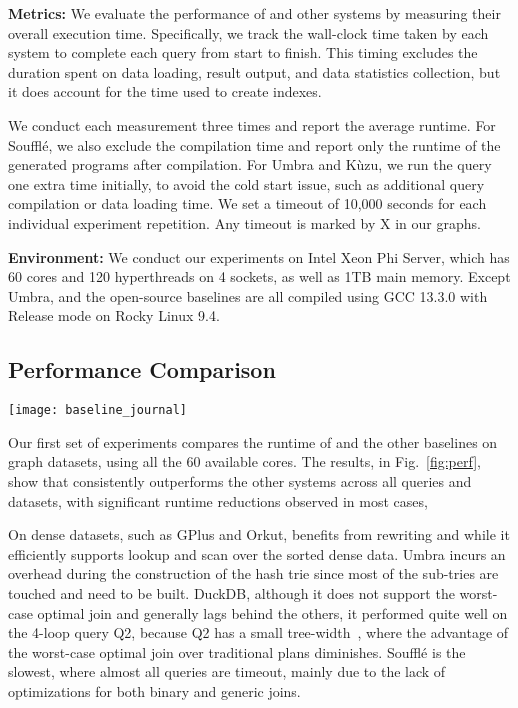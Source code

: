 \addvspace{\smallskipamount}
\noindent\textbf{Metrics:} We evaluate the performance of \name and other systems by measuring their overall execution time. Specifically, we track the wall-clock time taken by each system to complete each query from start to finish. This timing excludes the duration spent on data loading, result output, and data statistics collection, but it does account for the time used to create indexes.

We conduct each measurement three times and report the average runtime. 
For Soufflé, we also exclude the compilation time and report only the runtime of the generated programs after compilation. 
For Umbra and Kùzu, we run the query one extra time initially, to avoid the cold start issue, such as additional query compilation or data loading time.  
We set a timeout of 10,000 seconds for each individual experiment repetition.  
Any timeout is marked by X in our graphs.

\addvspace{\smallskipamount}
\noindent\textbf{Environment:} We conduct our experiments on Intel Xeon Phi Server, which has 60 cores and 120 hyperthreads on 4 sockets, as well as 1TB main memory. Except Umbra, \name and the open-source baselines are all compiled using GCC 13.3.0 with Release mode on Rocky Linux 9.4. 

\subsection{Performance Comparison}\label{subsec:exp:perf}

\begin{figure*}[t]
	\texttt{[image: baseline\_journal]}
  \caption{}
  \label{fig:perf}
\end{figure*}

Our first set of experiments compares the runtime of \name and the
other baselines on graph datasets, using all the 60 available
cores. The results,  in Fig.~\ref{fig:perf},  show that \name
consistently outperforms the other systems across all queries and
datasets, with significant runtime reductions observed in most cases,

On dense datasets, such as GPlus and Orkut, \name benefits from
rewriting and \indexlayout while it efficiently supports lookup and
scan over the sorted dense data. Umbra incurs an overhead during the
construction of the hash trie since most of the sub-tries are touched
and need to be built.  DuckDB, although it does not support
the worst-case optimal join and  generally lags behind the others, it performed quite well on the 4-loop query Q2, because Q2 has a small tree-width~\cite{DBLP:conf/pods/KhamisNR16}, where the advantage of the worst-case optimal join over traditional plans diminishes.  Soufflé is the slowest, where almost all queries are timeout, mainly due to the lack of optimizations for both binary and generic joins.


